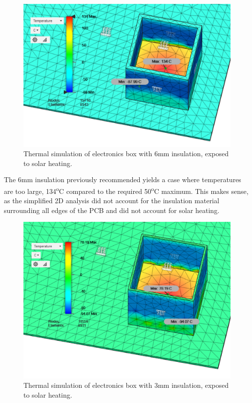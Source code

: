 	\begin{figure}[h!]
    \centering	
	\includegraphics[scale=0.58]{4-experiment-design/img/mechanical/6mmthickheat.PNG}
	\caption{Thermal simulation of electronics box with 6mm insulation, exposed to solar heating.}
	\label{fig:6mmthickheat}
    	\end{figure}

The 6mm insulation previously recommended yields a case where temperatures are too large, 134\textsuperscript{o}C compared to the required 50\textsuperscript{o}C maximum. This makes sense, as the simplified 2D analysis did not account for the insulation material surrounding all edges of the PCB and did not account for solar heating. 

	\begin{figure}[h!]
    \centering    	
    \includegraphics[scale=0.6]{4-experiment-design/img/mechanical/3mmthickheat.PNG}
	\caption{Thermal simulation of electronics box with 3mm insulation, exposed to solar heating.}
	\label{fig:3mmthickheat}
	\end{figure}


